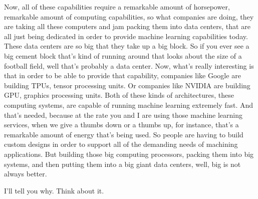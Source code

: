 Now, all of these capabilities require a remarkable amount of horsepower, remarkable amount of computing capabilities, so what companies are doing, they are taking all these computers and jam packing them into data centers, that are all just being dedicated in order to provide machine learning capabilities today.
These data centers are so big that they take up a big block.
So if you ever see a big cement block that's kind of running around that looks about the size of a football field, well that's probably a data center.
Now, what's really interesting is that in order to be able to provide that capability, companies like Google are building TPUs, tensor processing units.
Or companies like NVIDIA are building GPU, graphics processing units.
Both of these kinds of architectures, these computing systems, are capable of running machine learning extremely fast.
And that's needed, because at the rate you and I are using those machine learning services, when we give a thumbs down or a thumbs up, for instance, that's a remarkable amount of energy that's
being used.
So people are having to build custom designs in order to support all of the demanding needs of machining applications.
But building those big computing processors, packing them into big systems, and then putting them into a big giant data centers, well, big is not always better.

I'll tell you why. Think about it.


